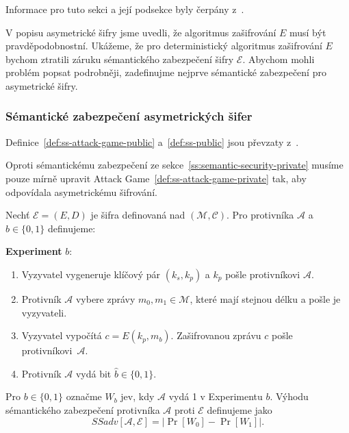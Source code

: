 \documentclass[
  program=infoi,
  biblatex=false,
  figures=true,
  glossaries,
  tables=false,
  sourcecodes=true,
  index
]{kidiplom}
\begin{document}
    Informace pro tuto sekci a její podsekce byly čerpány z~\cite{graduate-course}.

    V popisu asymetrické šifry jsme uvedli, že algoritmus zašifrování $E$ musí být pravděpodobnostní.
    Ukážeme, že pro deterministický algoritmus zašifrování $E$ bychom ztratili záruku sémantického zabezpečení šifry $\mathcal{E}$.
    Abychom mohli problém popsat podrobněji, zadefinujme nejprve sémantické zabezpečení pro asymetrické šifry.


    \subsubsection{Sémantické zabezpečení asymetrických šifer}\label{ss:semantic-security-public}

        Definice~\ref{def:ss-attack-game-public} a~\ref{def:ss-public} jsou převzaty z~\cite{graduate-course}.

        Oproti sémantickému zabezpečení ze sekce~\ref{ss:semantic-security-private}
        musíme pouze mírně upravit Attack Game~\ref{def:ss-attack-game-private} tak, aby odpovídala asymetrickému šifrování.

        \begin{definition}\label{def:ss-attack-game-public}
            
            Nechť $\mathcal{E} = (E, D)$ je šifra definovaná nad $(\mathcal{M},\mathcal{C})$.
            Pro protivníka $\mathcal{A}$ a $b \in \{0, 1\}$ definujeme:

            \medskip
            \textbf{Experiment} $b$:

            \begin{enumerate}
                \item
                    Vyzyvatel vygeneruje klíčový pár $(k_s, k_p)$ a $k_p$ pošle protivníkovi $\mathcal{A}$.
                \item 
                    Protivník $\mathcal{A}$ vybere zprávy $m_0, m_1 \in \mathcal{M}$, které mají stejnou délku a pošle je vyzyvateli.
                \item
                    Vyzyvatel vypočítá $c = E(k_p, m_b)$.
                    Zašifrovanou zprávu $c$ pošle protivníkovi~$\mathcal{A}$.
                \item
                    Protivník $\mathcal{A}$ vydá bit $\hat{b} \in \{0,1\}$.
            \end{enumerate}

            Pro $b \in \{0, 1\}$ označme $W_b$ jev, kdy $\mathcal{A}$ vydá 1 v Experimentu $b$.
            Výhodu sémantického zabezpečení protivníka $\mathcal{A}$ proti $\mathcal{E}$ definujeme jako
            \[
                SSadv[\mathcal{A}, \mathcal{E}] = \left\lvert\Pr[W_0] - \Pr[W_1]\right\rvert.
            \]

        \end{definition}
\end{document}
